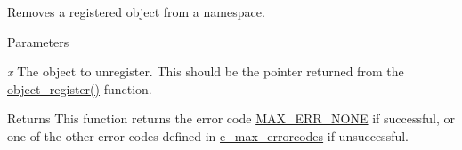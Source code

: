 Removes a registered object from a namespace. 
\begin{DoxyParams}{Parameters}
\item[{\em x}]The object to unregister. This should be the pointer returned from the \hyperlink{group__obj_gaaa97beba179d6aebd3f3ede1b5c781fa}{object\_\-register()} function. \end{DoxyParams}
\begin{DoxyReturn}{Returns}
This function returns the error code \hyperlink{group__misc_gga0764dd6c02b76cca7d053ae50555d69da6d22f77fef8b1e1b074cef5d29d935fd}{MAX\_\-ERR\_\-NONE} if successful, or one of the other error codes defined in \hyperlink{group__misc_ga0764dd6c02b76cca7d053ae50555d69d}{e\_\-max\_\-errorcodes} if unsuccessful. 
\end{DoxyReturn}
